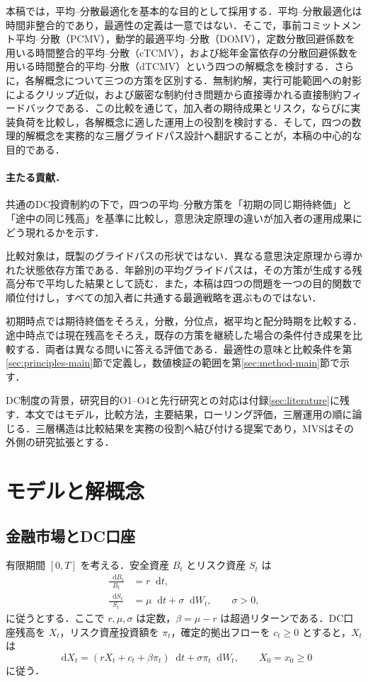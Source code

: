 \documentclass[10pt,a4paper]{article}
\theoremstyle{plain}
\theoremstyle{definition}
\newcommand{\dd}{\mathop{}\!\mathrm{d}}
\begin{document}
本稿では，平均--分散最適化を基本的な目的として採用する．平均--分散最適化は時間非整合的であり，最適性の定義は一意ではない．そこで，事前コミットメント平均--分散（PCMV），動学的最適平均--分散（DOMV），定数分散回避係数を用いる時間整合的平均--分散（cTCMV），および総年金富依存の分散回避係数を用いる時間整合的平均--分散（dTCMV）という四つの解概念を検討する．さらに，各解概念について三つの方策を区別する．無制約解，実行可能範囲への射影によるクリップ近似，および厳密な制約付き問題から直接導かれる直接制約フィードバックである．この比較を通じて，加入者の期待成果とリスク，ならびに実装負荷を比較し，各解概念に適した運用上の役割を検討する．そして，四つの数理的解概念を実務的な三層グライドパス設計へ翻訳することが，本稿の中心的な目的である．


\paragraph{主たる貢献．}
共通のDC投資制約の下で，四つの平均--分散方策を「初期の同じ期待終価」と「途中の同じ残高」を基準に比較し，意思決定原理の違いが加入者の運用成果にどう現れるかを示す．

比較対象は，既製のグライドパスの形状ではない．異なる意思決定原理から導かれた状態依存方策である．年齢別の平均グライドパスは，その方策が生成する残高分布で平均した結果として読む．また，本稿は四つの問題を一つの目的関数で順位付けし，すべての加入者に共通する最適戦略を選ぶものではない．

初期時点では期待終価をそろえ，分散，分位点，裾平均と配分時期を比較する．途中時点では現在残高をそろえ，既存の方策を継続した場合の条件付き成果を比較する．両者は異なる問いに答える評価である．最適性の意味と比較条件を第\ref{sec:principles-main}節で定義し，数値検証の範囲を第\ref{sec:method-main}節で示す．

DC制度の背景，研究目的O1--O4と先行研究との対応は付録\ref{sec:literature}に残す．本文ではモデル，比較方法，主要結果，ローリング評価，三層運用の順に論じる．三層構造は比較結果を実務の役割へ結び付ける提案であり，MVSはその外側の研究拡張とする．
\section{モデルと解概念}
\label{sec:model}

\subsection{金融市場とDC口座}

有限期間 $[0,T]$ を考える．安全資産 $B_t$ とリスク資産 $S_t$ は
\begin{align}
  \frac{\dd B_t}{B_t}&=r\dd t,\label{eq:riskless}\\
  \frac{\dd S_t}{S_t}&=\mu\dd t+\sigma\dd W_t,\qquad \sigma>0,\label{eq:risky}
\end{align}
に従うとする．ここで $r,\mu,\sigma$ は定数，$\beta=\mu-r$ は超過リターンである．DC口座残高を $X_t$，リスク資産投資額を $\pi_t$，確定的拠出フローを $c_t\geq0$ とすると，$X_t$ は
\begin{equation}
  \dd X_t=(rX_t+c_t+\beta\pi_t)\dd t+\sigma\pi_t\dd W_t,
  \qquad X_0=x_0\geq0
  \label{eq:X-dynamics}
\end{equation}
に従う．
\end{document}
